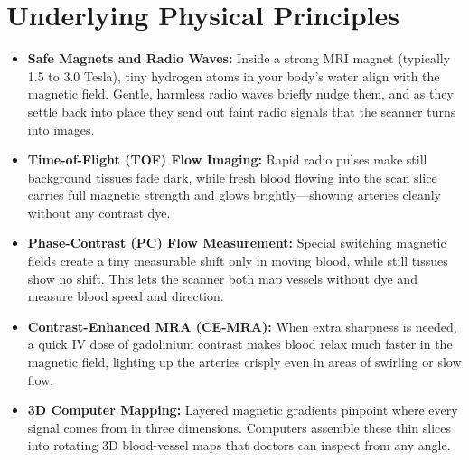 \section{Underlying Physical Principles}
\begin{itemize}
\item \textbf{Safe Magnets and Radio Waves:} Inside a strong MRI magnet (typically 1.5 to 3.0 Tesla), tiny hydrogen atoms in your body's water align with the magnetic field. Gentle, harmless radio waves briefly nudge them, and as they settle back into place they send out faint radio signals that the scanner turns into images.
\item \textbf{Time-of-Flight (TOF) Flow Imaging:} Rapid radio pulses make still background tissues fade dark, while fresh blood flowing into the scan slice carries full magnetic strength and glows brightly---showing arteries cleanly without any contrast dye.
\item \textbf{Phase-Contrast (PC) Flow Measurement:} Special switching magnetic fields create a tiny measurable shift only in moving blood, while still tissues show no shift. This lets the scanner both map vessels without dye and measure blood speed and direction.
\item \textbf{Contrast-Enhanced MRA (CE-MRA):} When extra sharpness is needed, a quick IV dose of gadolinium contrast makes blood relax much faster in the magnetic field, lighting up the arteries crisply even in areas of swirling or slow flow.
\item \textbf{3D Computer Mapping:} Layered magnetic gradients pinpoint where every signal comes from in three dimensions. Computers assemble these thin slices into rotating 3D blood-vessel maps that doctors can inspect from any angle.
\end{itemize}

